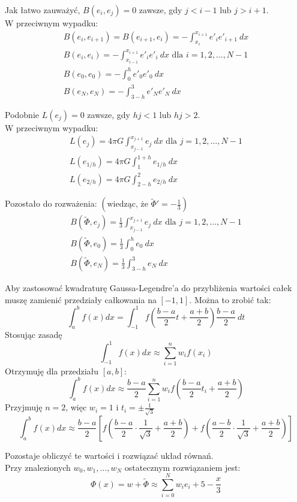 \documentclass{article}
\begin{document}
\noindent
Jak łatwo zauważyć, \(B(e_i, e_j) = 0\) zawsze, gdy \(j < i-1 \text{ lub } j > i+1\).\\
W przeciwnym wypadku:
\begin{gather*}
    B(e_i, e_{i+1}) = B(e_{i+1}, e_i) = -\int_{x_i}^{x_{i+1}} e'_i e'_{i+1}\ dx\\
    B(e_i, e_i) = -\int_{x_{i-1}}^{x_{i+1}} e'_i e'_i\ dx \text{ dla } i=1,2,\ldots,N-1\\
    B(e_0, e_0) = -\int_0^h e'_0 e'_0\ dx\\
    B(e_N, e_N) = -\int_{3-h}^3 e'_N e'_N\ dx
\end{gather*}

\noindent
Podobnie \(L(e_j) = 0\) zawsze, gdy \(hj < 1 \text{ lub } hj > 2\).\\
W przeciwnym wypadku:
\begin{gather*}
    L(e_j) = 4 \pi G \int_{x_{j-1}}^{x_{j+1}} e_j\ dx \text{ dla } j=1,2,\ldots,N-1\\
    L(e_{1/h}) = 4 \pi G \int_1^{1+h} e_{1/h}\ dx\\
    L(e_{2/h}) = 4 \pi G \int_{2-h}^2 e_{2/h}\ dx
\end{gather*}

\noindent
Pozostało do rozważenia: \(\left(\text{wiedząc, że } \tilde{\Phi}' = -\frac{1}{3}\right)\)
\begin{gather*}
    B(\tilde{\Phi}, e_j) = \frac{1}{3} \int_{x_{j-1}}^{x_{j+1}} e_j\ dx \text{ dla } j=1,2,\ldots,N-1\\
    B(\tilde{\Phi}, e_0) = \frac{1}{3} \int_0^h e_0\ dx\\
    B(\tilde{\Phi}, e_N) = \frac{1}{3} \int_{3-h}^3 e_N\ dx
\end{gather*}

\newpage
\noindent
Aby zastosować kwadraturę Gaussa-Legendre'a do przybliżenia wartości całek muszę zamienić przedziały całkowania na \([-1,1]\). Można to zrobić tak:
\[\int_a^b f(x)dx = \int_{-1}^1 f\left(\frac{b-a}{2} t + \frac{a+b}{2}\right)\frac{b-a}{2}\ dt\]
Stosując zasadę
\[\int_{-1}^1 f(x)dx \approx \sum_{i=1}^n w_i f(x_i)\]
Otrzymuję dla przedziału \([a,b]\):
\[\int_a^b f(x)dx \approx \frac{b-a}{2} \sum_{i=1}^n w_i f\left(\frac{b-a}{2} t_i + \frac{a + b}{2}\right)\]
Przyjmuję \(n=2\), więc \(w_i = 1 \text{ i } t_i = \pm \frac{1}{\sqrt{3}}\)
\[\int_a^b f(x)dx \approx \frac{b-a}{2} \left[f\left(\frac{b-a}{2} \cdot \frac{1}{\sqrt{3}} + \frac{a+b}{2}\right) + f\left(\frac{a-b}{2} \cdot \frac{1}{\sqrt{3}} + \frac{a+b}{2}\right)\right]\]

\vspace{5mm}
\noindent
Pozostaje obliczyć te wartości i rozwiązać układ równań.\\
Przy znalezionych \(w_0, w_1, \ldots, w_N\) ostatecznym rozwiązaniem jest:
\[\Phi(x) = w + \tilde{\Phi} \approx \sum_{i=0}^N w_i e_i + 5 - \frac{x}{3}\]
\end{document}
